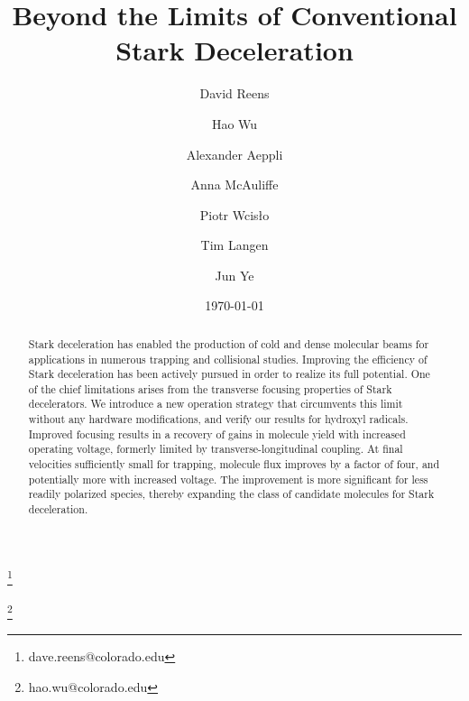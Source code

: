 \documentclass[%
 reprint,
 amsmath,amssymb,
 aps,
prl,
]{revtex4-1}
\begin{document}
\title{Beyond the Limits of Conventional Stark Deceleration}%

\author{David Reens}
\thanks{dave.reens@colorado.edu}


\author{Hao Wu}
\thanks{hao.wu@colorado.edu}

\author{Alexander Aeppli}
\author{Anna McAuliffe}

\author{Piotr Wcis\l o}

\author{Tim Langen}%

\author{Jun Ye}


\date{\today}



\begin{abstract}
Stark deceleration has enabled the production of cold and dense molecular beams for applications in numerous trapping and collisional studies. Improving the efficiency of Stark deceleration has been actively pursued in order to realize its full potential. One of the chief limitations arises from the transverse focusing properties of Stark decelerators. We introduce a new operation strategy that circumvents this limit without any hardware modifications, and verify our results for hydroxyl radicals. Improved focusing results in a recovery of gains in molecule yield with increased operating voltage, formerly limited by transverse-longitudinal coupling. At final velocities sufficiently small for trapping, molecule flux improves by a factor of four, and potentially more with increased voltage. The improvement is more significant for less readily polarized species, thereby expanding the class of candidate molecules for Stark deceleration.
\end{abstract}
\end{document}
